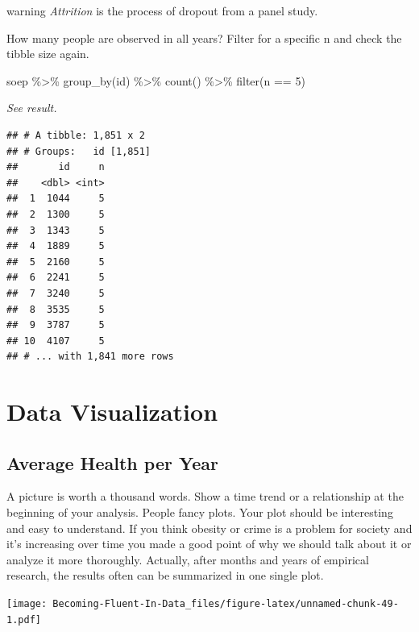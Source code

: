 \documentclass[
]{book}
\newenvironment{Shaded}{\begin{snugshade}}{\end{snugshade}}
\newcommand{\DecValTok}[1]{\textcolor[rgb]{0.00,0.00,0.81}{#1}}
\newcommand{\FunctionTok}[1]{\textcolor[rgb]{0.00,0.00,0.00}{#1}}
\newcommand{\NormalTok}[1]{#1}
\newcommand{\SpecialCharTok}[1]{\textcolor[rgb]{0.00,0.00,0.00}{#1}}
\begin{document}
\begin{infobox2}warning
\emph{Attrition} is the process of dropout from a panel study.

\end{infobox2}

How many people are observed in all years? Filter for a specific n and check the tibble size again.

\begin{Shaded}
\begin{Highlighting}[]
\NormalTok{soep }\SpecialCharTok{\%\textgreater{}\%} \FunctionTok{group\_by}\NormalTok{(id) }\SpecialCharTok{\%\textgreater{}\%} \FunctionTok{count}\NormalTok{() }\SpecialCharTok{\%\textgreater{}\%} \FunctionTok{filter}\NormalTok{(n }\SpecialCharTok{==} \DecValTok{5}\NormalTok{) }
\end{Highlighting}
\end{Shaded}

\emph{See result.}

\begin{verbatim}
## # A tibble: 1,851 x 2
## # Groups:   id [1,851]
##       id     n
##    <dbl> <int>
##  1  1044     5
##  2  1300     5
##  3  1343     5
##  4  1889     5
##  5  2160     5
##  6  2241     5
##  7  3240     5
##  8  3535     5
##  9  3787     5
## 10  4107     5
## # ... with 1,841 more rows
\end{verbatim}

\hypertarget{data-visualization}{%
\section{Data Visualization}\label{data-visualization}}

\hypertarget{average-health-per-year}{%
\subsection{Average Health per Year}\label{average-health-per-year}}

A picture is worth a thousand words. Show a time trend or a relationship at the beginning of your analysis. People fancy plots. Your plot should be interesting and easy to understand. If you think obesity or crime is a problem for society and it's increasing over time you made a good point of why we should talk about it or analyze it more thoroughly. Actually, after months and years of empirical research, the results often can be summarized in one single plot.

\texttt{[image: Becoming-Fluent-In-Data\_files/figure-latex/unnamed-chunk-49-1.pdf]}
\end{document}
